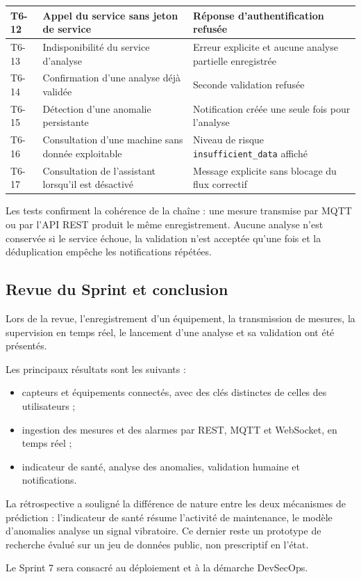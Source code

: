 {\begin{longtable}{|p{0.9cm}|>{\raggedright\arraybackslash}p{7cm}|>{\raggedright\arraybackslash}p{4.7cm}|}
T6-12 &
Appel du service sans jeton de service &
Réponse d'authentification refusée \\
\hline

T6-13 &
Indisponibilité du service d'analyse &
Erreur explicite et aucune analyse partielle enregistrée \\
\hline

T6-14 &
Confirmation d'une analyse déjà validée &
Seconde validation refusée \\
\hline

T6-15 &
Détection d'une anomalie persistante &
Notification créée une seule fois pour l'analyse \\
\hline

T6-16 &
Consultation d'une machine sans donnée exploitable &
Niveau de risque \texttt{insufficient\_data} affiché \\
\hline

T6-17 &
Consultation de l'assistant lorsqu'il est désactivé &
Message explicite sans blocage du flux correctif \\
\hline

\end{longtable}}

Les tests confirment la cohérence de la chaîne : une mesure transmise par MQTT ou par l'API REST produit le même enregistrement. Aucune analyse n'est conservée si le service échoue, la validation n'est acceptée qu'une fois et la déduplication empêche les notifications répétées.

\subsection{Revue du Sprint et conclusion}

Lors de la revue, l'enregistrement d'un équipement, la transmission de mesures, la supervision en temps réel, le lancement d'une analyse et sa validation ont été présentés.

Les principaux résultats sont les suivants :

\begin{itemize}[nosep,leftmargin=1.2em]
    \item capteurs et équipements connectés, avec des clés distinctes de celles des utilisateurs ;
    \item ingestion des mesures et des alarmes par REST, MQTT et WebSocket, en temps réel ;
    \item indicateur de santé, analyse des anomalies, validation humaine et notifications.
\end{itemize}

La rétrospective a souligné la différence de nature entre les deux mécanismes de prédiction : l'indicateur de santé résume l'activité de maintenance, le modèle d'anomalies analyse un signal vibratoire. Ce dernier reste un prototype de recherche évalué sur un jeu de données public, non prescriptif en l'état.

Le Sprint 7 sera consacré au déploiement et à la démarche DevSecOps.

